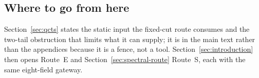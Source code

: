 \documentclass[../../main.tex]{subfiles}
\begin{document}
\subsection{Where to go from here}
\label{subsec:prelude-onward}

Section~\ref{sec:qcts} states the static input the fixed-cut route consumes and the two-tail
obstruction that limits what it can supply; it is in the main text rather than the appendices
because it is a fence, not a tool. Section~\ref{sec:introduction} then opens Route~E and
Section~\ref{sec:spectral-route} Route~S, each with the same eight-field gateway.
\end{document}
